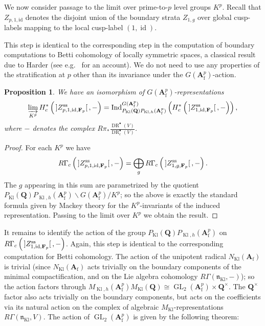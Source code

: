 \documentclass[cjm]{ipart}
\theoremstyle{plain}
\newtheorem{proposition}[theorem]{Proposition}
\theoremstyle{remark}
\DeclareMathOperator{\DR}{DR}
\DeclareMathOperator{\GL}{GL}
\DeclareMathOperator{\id}{id}
\DeclareMathOperator{\Kl}{Kl}
\DeclarePairedDelimiter{\tb}{{\,]}}{{[\, }} %
\newcommand{\Af}{\AA_{\mathrm{f}}}
\newcommand{\Fp}{\mathbf{F}_p}
\newcommand{\QQ}{\mathbf{Q}}
\renewcommand{\AA}{\mathbf{A}}
\numberwithin{equation}{subsection}
\begin{document}
  We now consider passage to the limit over prime-to-$p$ level groups $K^{p}$. Recall that $Z_{p, 1, \mathrm{id}}$ denotes the disjoint union of the boundary strata $Z_{1, g}$ over global cusp-labels mapping to the local cusp-label $(1, \id)$.
  
  \begin{remark}
   This step is identical to the corresponding step in the computation of boundary computations to Betti cohomology of locally symmetric spaces, a classical result due to Harder (see e.g.~\cite[\S 4.2.1]{harderraghuram20} for an account). We do not need to use any properties of the stratification at $p$ other than its invariance under the $G(\Af^p)$-action.
  \end{remark}
  
  \begin{proposition}
   We have an isomorphism of $G(\Af^p)$-representations
   \[ 
    \varinjlim_{K^p} H^*_{c}\left(\tb{Z_{p, 1, \mathrm{id}, \Fp}^{\mathrm{ss}}}, - \right) = \operatorname{Ind}_{P_{\Kl}(\QQ) P_{\Kl, h}(\Af^p)}^{G(\Af^p)}\left( H^*_c \left(\tb{Z_{1, \id, \Fp}^{\mathrm{ss}}}, -\right)\right),
   \]
   where $-$ denotes the complex $ R\pi_*\tfrac{\DR^\bullet(V)}{\DR^\bullet_c(V)}$.
  \end{proposition}
  
  \begin{proof}
   For each $K^p$ we have
   \[ R\Gamma_{c}\left(\tb{Z_{p, 1, \mathrm{id}, \Fp}^{\mathrm{ss}}}, - \right) = 
      \bigoplus_{g} 
       R\Gamma_{c}\left(\tb{Z_{1, g, \Fp}^{\mathrm{ss}}}, -\right).
   \]
   The $g$ appearing in this sum are parametrized by the quotient $P_{\Kl}(\QQ) P_{\Kl, h}(\Af^p) \backslash G(\Af^p) / K^p$; so the above is exactly the standard formula given by Mackey theory for the $K^p$-invariants of the induced representation. Passing to the limit over $K^p$ we obtain the result.
  \end{proof}
  
    
  It remains to identify the action of the group $P_{\Kl}(\QQ) P_{\Kl, h}(\Af^p)$ on $R\Gamma_c \left(\tb{Z_{1, \id, \Fp}^{\mathrm{ss}}}, -\right)$. Again, this step is identical to the corresponding computation for Betti cohomology. The action of the unipotent radical $N_{\Kl}(\Af)$ is trivial (since $N_{\Kl}(\Af)$ acts trivially on the boundary components of the minimal compactification, and on the Lie algebra cohomology $R\Gamma(\mathfrak{n}_{\Kl}, -)$); so the action factors through $M_{\Kl, h}(\Af^p) M_{\Kl}(\QQ) \cong \GL_2(\Af^p) \times \QQ^\times$. The $\QQ^\times$ factor also acts trivially on the boundary components, but acts on the coefficients via its natural action on the complex of algebraic $M_{\Kl}$-representations $R\Gamma(\mathfrak{n}_{\Kl}, V)$. The action of $\GL_2(\Af^p)$ is given by the following theorem:
  
\end{document}

